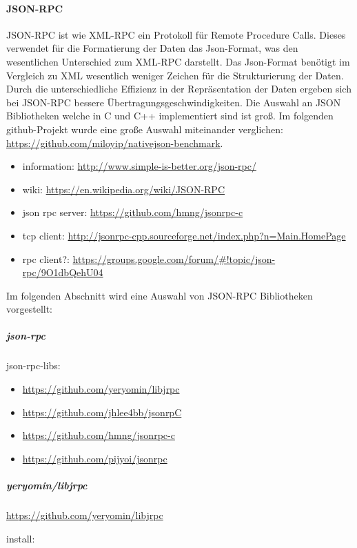 \documentclass[a4paper,10pt]{article}
\numberwithin{figure}{section}
\numberwithin{table}{section}
\begin{document}
\paragraph{JSON-RPC}

JSON-RPC ist wie XML-RPC ein Protokoll für Remote Procedure Calls.
Dieses verwendet für die Formatierung der Daten das Json-Format, was den wesentlichen Unterschied zum XML-RPC darstellt.
Das Json-Format benötigt im Vergleich zu XML wesentlich weniger Zeichen für die Strukturierung der Daten.
Durch die unterschiedliche Effizienz in der Repräsentation der Daten ergeben sich bei JSON-RPC bessere Übertragungsgeschwindigkeiten.
Die Auswahl an JSON Bibliotheken welche in C und C++ implementiert sind ist groß.
Im folgenden github-Projekt wurde eine große Auswahl miteinander verglichen: \url{https://github.com/miloyip/nativejson-benchmark}.

\begin{itemize}
 \item information: \url{http://www.simple-is-better.org/json-rpc/}
 \item wiki: \url{https://en.wikipedia.org/wiki/JSON-RPC}
 \item json rpc server: \url{https://github.com/hmng/jsonrpc-c}
 \item tcp client: \url{http://jsonrpc-cpp.sourceforge.net/index.php?n=Main.HomePage}
 \item rpc client?: \url{https://groups.google.com/forum/#!topic/json-rpc/9O1dbQehU04}
\end{itemize}

Im folgenden Abschnitt wird eine Auswahl von JSON-RPC Bibliotheken vorgestellt:

\subparagraph{json-rpc}

json-rpc-libs:
\begin{itemize}
 \item \url{https://github.com/yeryomin/libjrpc}
 \item \url{https://github.com/jhlee4bb/jsonrpC}
 \item \url{https://github.com/hmng/jsonrpc-c}
 \item \url{https://github.com/pijyoi/jsonrpc}
\end{itemize}

\subparagraph{yeryomin/libjrpc}

\url{https://github.com/yeryomin/libjrpc}

install:
\end{document}
